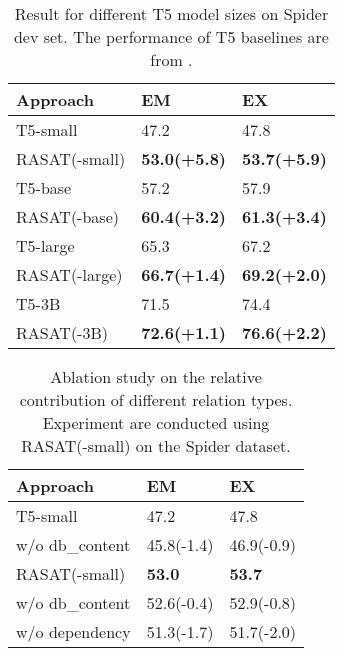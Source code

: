 \documentclass[11pt]{article}
\begin{document}
\begin{table}
\small
\centering
\begin{tabular}{lll}
\toprule
Approach      & EM                  & EX                  \\ 
\midrule
T5-small      & 47.2                & 47.8                \\
RASAT(-small) & \textbf{53.0(+5.8)} & \textbf{53.7(+5.9)} \\ 
\midrule
T5-base       & 57.2                & 57.9                \\
RASAT(-base)  & \textbf{60.4(+3.2)} & \textbf{61.3(+3.4)} \\ 
\midrule
T5-large      & 65.3                & 67.2                \\
RASAT(-large) & \textbf{66.7(+1.4)} & \textbf{69.2(+2.0)} \\ 
\midrule
T5-3B         & 71.5                & 74.4                \\
RASAT(-3B)    & \textbf{72.6(+1.1)} & \textbf{76.6(+2.2)} \\ 
\bottomrule
\end{tabular}
\caption{Result for different T5 model sizes on Spider dev set. The performance of T5 baselines are from \citet{scholak-etal-2021-picard}.}
\label{tab:ablation_size}
\end{table}




\begin{table}
\centering
\small
\begin{tabular}{lll}
\toprule
Approach        & EM         & EX         \\ 
\midrule
T5-small        & 47.2       & 47.8       \\
\quad w/o db\_content & 45.8(-1.4) & 46.9(-0.9) \\
\midrule
RASAT(-small)    & \textbf{53.0}       & \textbf{53.7}       \\
\quad w/o db\_content & 52.6(-0.4) & 52.9(-0.8) \\
\quad w/o dependency    & 51.3(-1.7) & 51.7(-2.0) \\
\bottomrule
\end{tabular}
\caption{Ablation study on the relative contribution of different relation types. Experiment are conducted using RASAT(-small) on the Spider dataset.}
\label{tab:spider_relation_ablation}
\end{table}
\end{document}

